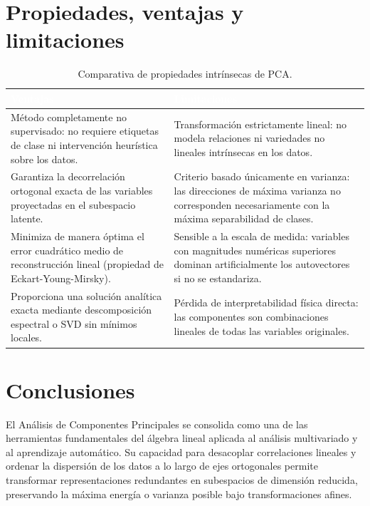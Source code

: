 \documentclass[11pt,letterpaper]{article}
\begin{document}
	\newpage
	
	\section{Propiedades, ventajas y limitaciones}
	
	\begin{table}[h!]
		\centering
		\caption{Comparativa de propiedades intrínsecas de PCA.}
		\label{tab:ventajas}
		\begin{tabular}{@{}p{6.6cm}p{6.6cm}@{}}
			\toprule
			\rowcolor{accent!85}
			\textcolor{white}{\textbf{Ventajas}} & \textcolor{white}{\textbf{Limitaciones}} \\
			\midrule
			Método completamente no supervisado: no requiere etiquetas de clase ni intervención heurística sobre los datos. & Transformación estrictamente lineal: no modela relaciones ni variedades no lineales intrínsecas en los datos. \\
			\addlinespace
			Garantiza la decorrelación ortogonal exacta de las variables proyectadas en el subespacio latente. & Criterio basado únicamente en varianza: las direcciones de máxima varianza no corresponden necesariamente con la máxima separabilidad de clases. \\
			\addlinespace
			Minimiza de manera óptima el error cuadrático medio de reconstrucción lineal (propiedad de Eckart-Young-Mirsky). & Sensible a la escala de medida: variables con magnitudes numéricas superiores dominan artificialmente los autovectores si no se estandariza. \\
			\addlinespace
			Proporciona una solución analítica exacta mediante descomposición espectral o SVD sin mínimos locales. & Pérdida de interpretabilidad física directa: las componentes son combinaciones lineales de todas las variables originales. \\
			\bottomrule
		\end{tabular}
	\end{table}
	\newpage
	\section{Conclusiones}
	
	El Análisis de Componentes Principales se consolida como una de las herramientas fundamentales del álgebra lineal aplicada al análisis multivariado y al aprendizaje automático. Su capacidad para desacoplar correlaciones lineales y ordenar la dispersión de los datos a lo largo de ejes ortogonales permite transformar representaciones redundantes en subespacios de dimensión reducida, preservando la máxima energía o varianza posible bajo transformaciones afines.
	
\end{document}
